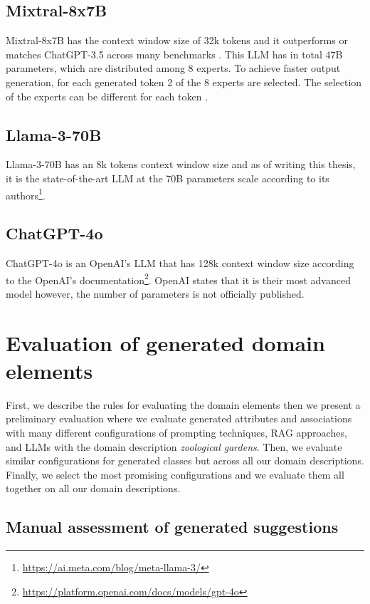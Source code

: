\subsection{Mixtral-8x7B}

Mixtral-8x7B has the context window size of 32k tokens and it outperforms or matches ChatGPT-3.5 across many benchmarks \cite{Jiang2024}. This LLM has in total 47B parameters, which are distributed among 8 experts. To achieve faster output generation, for each generated token 2 of the 8 experts are selected. The selection of the experts can be different for each token \cite{Jiang2024}.


\subsection{Llama-3-70B}

Llama-3-70B has an 8k tokens context window size and as of writing this thesis, it is the state-of-the-art LLM at the 70B parameters scale according to its authors\footnote{\url{https://ai.meta.com/blog/meta-llama-3/}}.


\subsection{ChatGPT-4o}

ChatGPT-4o is an OpenAI's LLM that has 128k context window size according to the OpenAI's documentation\footnote{\url{https://platform.openai.com/docs/models/gpt-4o}}. OpenAI states that it is their most advanced model however, the number of parameters is not officially published.


\section{Evaluation of generated domain elements}

First, we describe the rules for evaluating the domain elements then we present a preliminary evaluation where we evaluate generated attributes and associations with many different configurations of prompting techniques, RAG approaches, and LLMs with the domain description \textit{zoological gardens}. Then, we evaluate similar configurations for generated classes but across all our domain descriptions. Finally, we select the most promising configurations and we evaluate them all together on all our domain descriptions.


\subsection{Manual assessment of generated suggestions}


